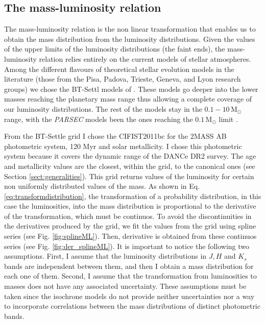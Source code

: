 \subsection{The mass-luminosity relation}
\label{sect:mass-luminosity}
The mass-luminosity relation is the non linear transformation that enables us to obtain the mass distribution from the luminosity distributions. Given the values of the upper limits of the luminosity distributions (the faint ends), the mass-luminosity relation relies entirely on the current models of stellar atmospheres. Among the different flavours of theoretical stellar evolution models in the literature (those from the Pisa, Padova, Trieste, Geneva, and Lyon research groups)  we chose the BT-Settl models of \citet{Allard2012}. These models go deeper into the lower masses reaching the planetary mass range thus allowing a complete coverage of our luminosity distributions. The rest of the models stay in the $0.1-10\,\mathrm{M_{\odot}}$ range, with the \emph{PARSEC} models been the ones reaching the $0.1\,\mathrm{M_{\odot}}$ limit \citep{Bressan2012}. 

From the BT-Settle grid I chose the CIFIST2011bc for the 2MASS AB photometric system, 120 Myr and solar metallicity. I chose this photometric system because it covers the dynamic range of the DANCe DR2 survey. The age and metallicity values are the closest, within the grid, to the canonical ones (see Section \ref{sect:generalities}). This grid returns values of the luminosity for certain non uniformly distributed values of the mass. As shown in Eq. \ref{eq:transformdistribution}, the transformation of a probability distribution, in this case the luminosities, into the mass distribution is proportional to the derivative of the transformation, which must be continuos. To avoid the discontinuities in the derivatives produced by the grid, we fit the values from the grid using spline series (see Fig. \ref{fig:splineML}). Then, derivative is obtained from these continuos series (see Fig. \ref{fig:der_splineML}). It is important to notice the following two assumptions. First, I assume that the luminosity distributions in $J,H$ and $K_s$ bands are independent between them, and then I obtain a mass distribution for each one of them. Second, I assume that the transformation from luminosities to masses does not have any associated uncertainty. These assumptions must be taken since the isochrone models do not provide neither uncertainties nor a way to incorporate correlations between the mass distributions of distinct photometric bands. 

